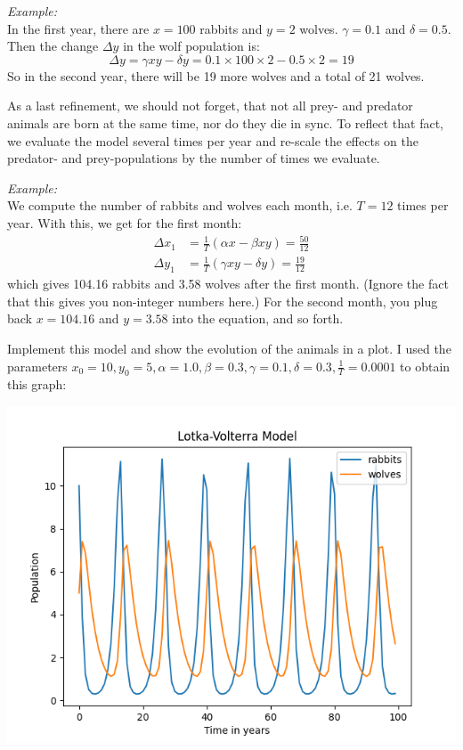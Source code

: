 \documentclass[
	english,
	fontsize=10pt,
	parskip=half,
	titlepage=true,
	DIV=12
]{scrartcl}
\begin{document}
\emph{Example:}\\
In the first year, there are $x = 100$ rabbits and $y = 2$ wolves. $\gamma = 0.1$ and $\delta = 0.5$. Then the change $\Delta y$ in the wolf population is:
\[ \Delta y = \gamma x y - \delta y = 0.1 \times 100 \times 2 - 0.5 \times 2 = 19 \]
So in the second year, there will be 19 more wolves and a total of 21 wolves.

As a last refinement, we should not forget, that not all prey- and predator animals are born at the same time, nor do they die in sync. To reflect that fact, we evaluate the model several times per year and re-scale the effects on the predator- and prey-populations by the number of times we evaluate.

\emph{Example:}\\
We compute the number of rabbits and wolves each month, i.e. $T = 12$ times per year. With this, we get for the first month:
\begin{align*}
	\Delta x_1 &= \frac{1}{T} (\alpha x   - \beta x y) = \frac{50}{12} \\
	\Delta y_1 &= \frac{1}{T} (\gamma x y - \delta  y) = \frac{19}{12}
\end{align*}
which gives 104.16 rabbits and 3.58 wolves after the first month. (Ignore the fact that this gives you non-integer numbers here.) For the second month, you plug back $x = 104.16$ and $y = 3.58$ into the equation, and so forth.

Implement this model and show the evolution of the animals in a plot. I used the parameters $x_0 = 10, y_0 = 5, \alpha = 1.0, \beta = 0.3, \gamma = 0.1, \delta = 0.3, \frac{1}{T} = 0.0001$ to obtain this graph:

\begin{center}
	\includegraphics[width=.6\linewidth]{./Lotka-Voltera}
\end{center}
\end{document}
